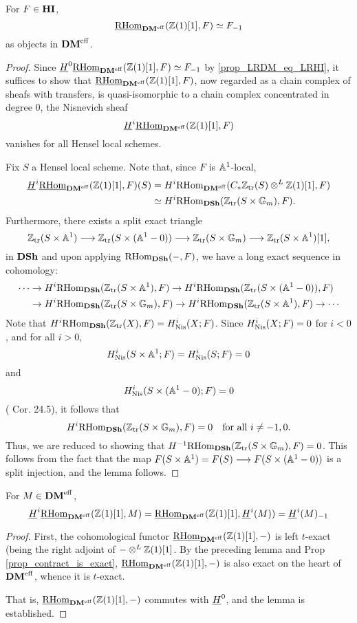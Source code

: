 \begin{lem}[D\'eglise]\label{lem_rhomDM_and_contract}
For $F \in \HI$,
\[
\ihomDMf(\Z(1)[1], F) \simeq \RHI{F}
\]
as objects in $\DMeff$.
\end{lem}
\begin{proof}
Since $\sheaf{H}^0 \ihomDMf(\Z(1)[1], F) \simeq \RHI{F}$ by 
\ref{prop_LRDM_eq_LRHI}, it suffices to show that 
$\ihomDMf(\Z(1)[1], F)$, now regarded as a chain complex of
sheafs with transfers, is quasi-isomorphic to a chain complex 
concentrated in degree 0, the Nisnevich sheaf
\[
\sheaf{H}^i\ihomDMf(\Z(1)[1], F)
\]
vanishes for all Hensel local schemes.

Fix $S$ a Hensel local scheme. Note that, since $F$ is $\A^1$-local,
\begin{align*}
\sheaf{H}^i\ihomDMf(\Z(1)[1], F)(S) &= H^i\rhomDMf(\CZtr(S) 
   \tDM \Z(1)[1], F) \\
   &\simeq H^i\homDSh(\Ztr(S \times 
   \Gm), F).
\end{align*}
Furthermore, there exists a split exact triangle
\[
\Ztr(S \times \A^1) \to \Ztr(S \times (\A^1 - 0)) \to 
   \Ztr(S \times \Gm) \to \Ztr(S \times \A^1)[1],
\]
in $\DSh$ and upon applying $\homDSh(-, F)$, we have a long exact 
sequence in cohomology:
\begin{align*}
\cdots & \rightarrow H^i\homDSh(\Ztr(S \times \A^1), F) 
   \rightarrow H^i\homDSh(\Ztr(S \times (\A^1 - 0)), F) \\
 & \rightarrow H^i\homDSh(\Ztr(S \times \Gm), F) \rightarrow 
   H^i\homDSh(\Ztr(S \times \A^1), F) \rightarrow \cdots
\end{align*}
Note that $H^i\homDSh(\Ztr(X), F) = H_{\Nis}^i(X; F)$. Since
$H^i_{\Nis}(X; F) = 0$ for $i < 0$, and for all $i > 0$, 
\[
H_{\Nis}^i(S \times \A^1; F) = H_{\Nis}^i(S; F) = 0
\] 
and 
\[
H_{\Nis}^i(S \times (\A^1 - 0); F) = 0
\] 
(\cite{MVW} Cor. 24.5), it follows that 
\[
H^i\homDSh(\Ztr(S \times \Gm), F) = 0 \quad\textrm{for all $i \neq -1, 0$.}
\] 
Thus, we are reduced to showing that $H^{-1}\homDSh(\Ztr(S \times 
\Gm), F) = 0$. This follows from the fact that the map $F(S \times 
\A^1) = F(S) \to F(S \times (\A^1 - 0))$ is a split injection, and 
the lemma follows.
\end{proof}

\begin{lem}[D\'eglise]\label{lem_H_com_ihom_DM}
For $M \in \DMeff$, 
\[
\sheaf{H}^i\ihomDMf(\Z(1)[1], M) = \ihomDMf(\Z(1)[1], \sheaf{H}^i(M)) = 
   \RHI{\sheaf{H}^i(M)}
\]
\end{lem}
\begin{proof}
First, the cohomological functor $\ihomDMf(\Z(1)[1], -)$ is left 
$t$-exact (being the right adjoint of $-\tDM \Z(1)[1]$. By the 
preceding lemma and Prop \ref{prop_contract_is_exact},
$\ihomDMf(\Z(1)[1], -)$ is also exact on the heart of $\DMeff$,
whence it is $t$-exact.

That is, $\ihomDMf(\Z(1)[1], -)$ commutes with $\sheaf{H}^0$,
and the lemma is established.
\end{proof}

